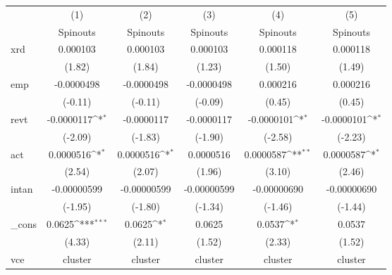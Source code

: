 {
\def\sym#1{\ifmmode^{#1}\else\(^{#1}\)\fi}
\begin{tabular}{l*{5}{c}}
\hline\hline
            &\multicolumn{1}{c}{(1)}&\multicolumn{1}{c}{(2)}&\multicolumn{1}{c}{(3)}&\multicolumn{1}{c}{(4)}&\multicolumn{1}{c}{(5)}\\
            &\multicolumn{1}{c}{Spinouts}&\multicolumn{1}{c}{Spinouts}&\multicolumn{1}{c}{Spinouts}&\multicolumn{1}{c}{Spinouts}&\multicolumn{1}{c}{Spinouts}\\
\hline
xrd         &    0.000103         &    0.000103         &    0.000103         &    0.000118         &    0.000118         \\
            &      (1.82)         &      (1.84)         &      (1.23)         &      (1.50)         &      (1.49)         \\
[1em]
emp         &  -0.0000498         &  -0.0000498         &  -0.0000498         &    0.000216         &    0.000216         \\
            &     (-0.11)         &     (-0.11)         &     (-0.09)         &      (0.45)         &      (0.45)         \\
[1em]
revt        &  -0.0000117\sym{*}  &  -0.0000117         &  -0.0000117         &  -0.0000101\sym{*}  &  -0.0000101\sym{*}  \\
            &     (-2.09)         &     (-1.83)         &     (-1.90)         &     (-2.58)         &     (-2.23)         \\
[1em]
act         &   0.0000516\sym{*}  &   0.0000516\sym{*}  &   0.0000516         &   0.0000587\sym{**} &   0.0000587\sym{*}  \\
            &      (2.54)         &      (2.07)         &      (1.96)         &      (3.10)         &      (2.46)         \\
[1em]
intan       & -0.00000599         & -0.00000599         & -0.00000599         & -0.00000690         & -0.00000690         \\
            &     (-1.95)         &     (-1.80)         &     (-1.34)         &     (-1.46)         &     (-1.44)         \\
[1em]
\_cons      &      0.0625\sym{***}&      0.0625\sym{*}  &      0.0625         &      0.0537\sym{*}  &      0.0537         \\
            &      (4.33)         &      (2.11)         &      (1.52)         &      (2.33)         &      (1.52)         \\
\hline
vce         &     cluster         &     cluster         &     cluster         &     cluster         &     cluster         \\

\end{tabular}}
